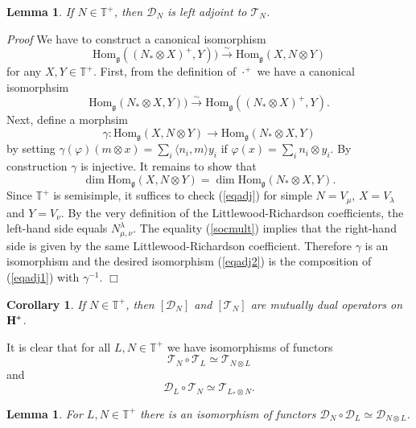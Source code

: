 \documentclass[11pt]{amsart}
\newcounter{theorem}
\newtheorem{lemma}[theo]{Lemma}
\newtheorem{corollary}[theo]{Corollary}
\renewenvironment{proof}{ \emph{Proof}}{$\Box$}
\newcommand{\TT}{\mathbb{T}}
\renewcommand{\gg}{\mathfrak{g}}
\newcommand{\Hom}{\mathrm{Hom}}
\begin{document}
\begin{lemma}\label{adjoint} If $N\in\TT^+$, then $\mathcal D_N$ is left adjoint to $\mathcal T_N$.
\end{lemma}
\begin{proof} We have to construct a canonical isomorphism
\begin{equation}\label{eqadj2}
\Hom_\gg((N_*\otimes X)^+,Y))\xrightarrow{\sim} \Hom_\gg(X,N\otimes Y)
\end{equation}
for any $X,Y\in\TT^+$. 
First, from the definition of ${\cdot}^+$ we have a canonical isomorphsim
\begin{equation}\label{eqadj1}
\Hom_\gg(N_*\otimes X,Y))\xrightarrow{\sim}\Hom_\gg((N_*\otimes X)^+,Y).
\end{equation}
Next, define a morphsim 
$$\gamma: \Hom_\gg(X,N\otimes Y)\to \Hom_\gg(N_*\otimes X,Y)$$
by setting $\gamma(\varphi)(m\otimes x)=\sum_i \langle n_i,m\rangle y_i$
if $\varphi(x)=\sum_i n_i\otimes y_i$.
By construction $\gamma$ is injective. It remains to show that
\begin{equation}\label{eqadj}
\dim\Hom_\gg(X,N\otimes Y)= \dim\Hom_\gg(N_*\otimes X,Y).
\end{equation}
Since $\TT^+$ is semisimple, it suffices to check (\ref{eqadj}) for
simple $N=V_\mu$, $X=V_\lambda$ and $Y=V_\nu$. By the very definition of the Littlewood-Richardson coefficients, the left-hand side equals
$N^{\lambda}_{\mu,\nu}$. The equality (\ref{socmult}) implies that the right-hand side is given by the same Littlewood-Richardson coefficient.
Therefore $\gamma$ is an isomorphism and the desired isomorphism (\ref{eqadj2}) is the composition of (\ref{eqadj1}) with $\gamma^{-1}$.
\end{proof}

\begin{corollary}\label{coradj} If $N\in\TT^+$, then $[\mathcal D_N]$ and $[\mathcal T_N]$ are mutually dual operators on $\bold{H}^+$.
\end{corollary}

It is clear that for all $L,N\in\TT^+$ we have isomorphisms of functors
$$\mathcal T_N\circ\mathcal T_L\simeq \mathcal T_{N\otimes L}$$
and 
$$\mathcal D_L\circ \mathcal T_N\simeq \mathcal T_{L_*\otimes N}.$$

\begin{lemma}\label{lemma3} For $L,N\in\mathbb T^+$ there is an isomorphism of functors 
$\mathcal D_N\circ \mathcal D_L\simeq \mathcal D_{N\otimes L}$.
\end{lemma}
\end{document}
